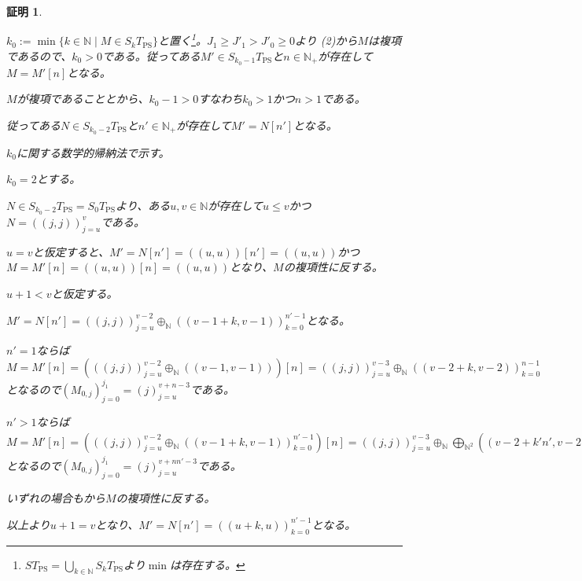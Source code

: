 \documentclass[dvipdfmx,uplatex]{jsarticle}
\theoremstyle{customnonumberbreakfortheorem}
\theoremstyle{customnonumberbreakforproof}
\newtheorem{hideableproof}{証明}
\begin{document}
\begin{hideableproof}
	\begin{indented}
		\item \(k_0 := \min \{k \in \mathbb{N} \mid M \in S_kT_{\textrm{PS}}\}\)と置く\footnote{\(ST_{\textrm{PS}} = \bigcup_{k \in \mathbb{N}} S_kT_{\textrm{PS}}\)より\(\min\)は存在する。}。\(J_1 \geq J'_1 > J'_0 \geq 0\)より (2)から\(M\)は複項であるので、\(k_0 > 0\)である。従ってある\(M' \in S_{k_0-1}T_{\textrm{PS}}\)と\(n \in \mathbb{N}_{+}\)が存在して\(M = M'[n]\)となる。
		\item \(M\)が複項であることとから、\(k_0-1 > 0\)すなわち\(k_0 > 1\)かつ\(n > 1\)である。
		\item 従ってある\(N \in S_{k_0-2}T_{\textrm{PS}}\)と\(n' \in \mathbb{N}_{+}\)が存在して\(M' = N[n']\)となる。
		\item \(k_0\)に関する数学的帰納法で示す。
		\item \(k_0 = 2\)とする。
		\begin{indented}
			\item \(N \in S_{k_0-2}T_{\textrm{PS}} = S_0T_{\textrm{PS}}\)より、ある\(u,v \in \mathbb{N}\)が存在して\(u \leq v\)かつ\(N = ((j,j))_{j=u}^{v}\)である。
			\item \(u = v\)と仮定すると、\(M' = N[n'] = ((u,u))[n'] = ((u,u))\)かつ\(M = M'[n] = ((u,u))[n] = ((u,u))\)となり、\(M\)の複項性に反する。
			\item \(u+1 < v\)と仮定する。
			\begin{indented}
				\item \(M' = N[n'] = ((j,j))_{j=u}^{v-2} \oplus_{\mathbb{N}} ((v-1+k,v-1))_{k=0}^{n'-1}\)となる。
				\item \(n' = 1\)ならば\(M = M'[n] = (((j,j))_{j=u}^{v-2} \oplus_{\mathbb{N}} ((v-1,v-1)))[n] = ((j,j))_{j=u}^{v-3} \oplus_{\mathbb{N}} ((v-2+k,v-2))_{k=0}^{n-1}\)となるので\((M_{0,j})_{j=0}^{j_1} = (j)_{j=u}^{v+n-3}\)である。
				\item \(n' > 1\)ならば\(M = M'[n] = (((j,j))_{j=u}^{v-2} \oplus_{\mathbb{N}} ((v-1+k,v-1))_{k=0}^{n'-1})[n] = ((j,j))_{j=u}^{v-3} \oplus_{\mathbb{N}} \bigoplus_{\mathbb{N}^2} ((v-2+k'n',v-2) \oplus_{\mathbb{N}^2} ((v-1+k+k'n',v-1))_{k=0}^{n'-2})_{k'=0}^{n-1}\)となるので\((M_{0,j})_{j=0}^{j_1} = (j)_{j=u}^{v+nn'-3}\)である。
				\item いずれの場合もから\(M\)の複項性に反する。
			\end{indented}
			\item 以上より\(u+1 = v\)となり、\(M' = N[n'] = ((u+k,u))_{k=0}^{n'-1}\)となる。

\end{indented}
\end{indented}
\end{hideableproof}
\end{document}
